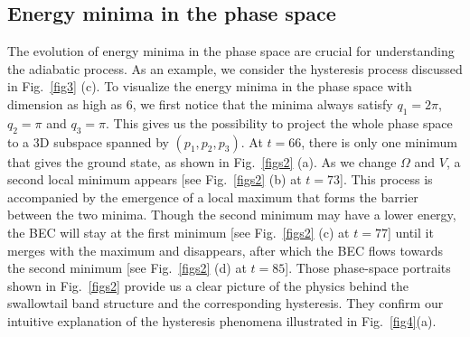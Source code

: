 \documentclass[twocolumn,prl,floatfix,citeautoscript,nofootinbib]{revtex4-1}
\begin{document}
\begin{appendix}
\subsection{Energy minima in the phase space}
The evolution of energy minima in the phase space
are crucial for understanding the
adiabatic process. As an example, we consider the hysteresis process discussed in Fig.~\ref{fig3} (c).
To visualize the energy minima in the
phase space with dimension as high as $6$,
we first notice that the minima always satisfy
$q_1=2\pi$, $q_2=\pi$ and $q_3=\pi$.
This gives
us the possibility to project the whole phase space to a 3D subspace spanned by $(p_1,p_2,p_3)$.
At $t=66$, there is only one minimum that gives
the ground state, as shown in Fig.~\ref{figs2} (a).
As we change $\Omega$ and $V$, a second local minimum appears [see Fig.~\ref{figs2} (b) at $t=73$]. This process is accompanied by the emergence of a
local maximum that forms the barrier between the two minima.
Though the second minimum may have a lower energy, the BEC will stay at the first minimum
[see Fig.~\ref{figs2} (c) at $t=77$] until it merges with
the maximum and disappears, after which the
BEC flows towards the second minimum [see Fig.~\ref{figs2} (d) at $t=85$].
Those phase-space portraits shown in Fig.~\ref{figs2} provide us
a clear picture of the physics behind the swallowtail band structure and the corresponding hysteresis. They confirm our intuitive explanation of the hysteresis phenomena illustrated in Fig.~\ref{fig4}(a).


\end{appendix}
\end{document}
